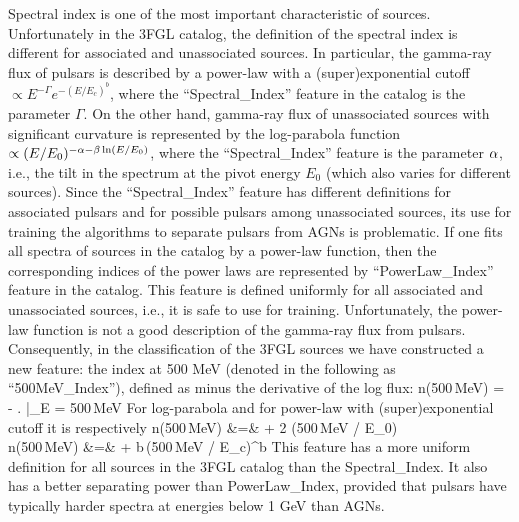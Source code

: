 Spectral index is one of the most important characteristic of sources. 
Unfortunately in the 3FGL catalog, the definition of the spectral index is different for associated and unassociated sources.
In particular, the gamma-ray flux of pulsars is described by a power-law with a (super)exponential cutoff $\propto E^{-\Gamma} e^{-(E / E_c)^b}$, where the ``Spectral\_Index'' feature in the catalog is the parameter $\Gamma$.
On the other hand, gamma-ray flux of unassociated sources with significant curvature is represented by the log-parabola function $\propto (E/E_0)^{-\alpha - \beta \ln (E/E_0)}$,
where the ``Spectral\_Index'' feature is the parameter $\alpha$, i.e., the tilt in the spectrum at the pivot energy $E_0$ (which also varies for different sources).
Since the ``Spectral\_Index'' feature has different definitions for associated pulsars and for possible pulsars among unassociated sources,
its use for training the algorithms to separate pulsars from AGNs is problematic.
If one fits all spectra of sources in the catalog by a power-law function, then the corresponding indices of the power laws are represented by
``PowerLaw\_Index'' feature in the catalog.
This feature is defined uniformly for all associated and unassociated sources, i.e., it is safe to use for training.
Unfortunately, the power-law function is not a good description of the gamma-ray flux from pulsars.
Consequently, in the classification of the 3FGL sources we have constructed a new feature: the index at 500 MeV (denoted in the following as ``500MeV\_Index''), defined as minus the derivative of the log flux:
\bea
{}
n({\rm 500\,MeV}) = - \left.  \right|_{E = \rm 500\,MeV}
\eea
For log-parabola and for power-law with (super)exponential cutoff it is respectively
\bea
n(\rm 500\,MeV) &=& \al + 2 \bt \ln(\rm 500\,MeV / E_0)    \\
n({\rm 500\,MeV}) &=& \Gamma + b\,({\rm 500\,MeV} / E_c)^b
\eea
This feature has a more uniform definition for all sources in the 3FGL catalog than the Spectral\_Index. It also has a better separating power 
than PowerLaw\_Index, provided that pulsars have typically harder spectra at energies below 1 GeV than AGNs.


